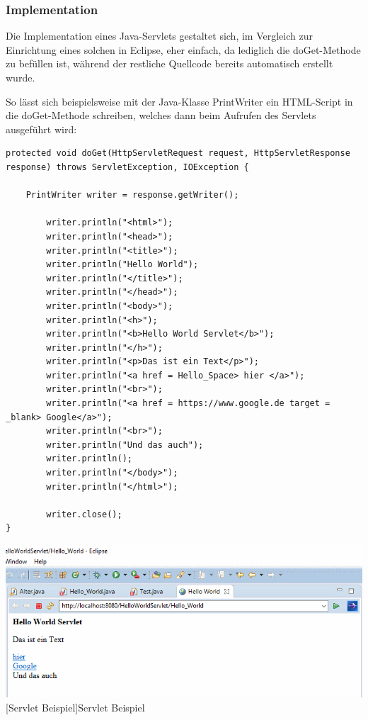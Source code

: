 \documentclass[12pt,a4paper,bibliography=totocnumbered,listof=totocnumbered]{scrartcl}
\begin{document}
\subsubsection{Implementation}
Die Implementation eines Java-Servlets gestaltet sich, im Vergleich zur Einrichtung eines solchen in Eclipse, eher einfach, da lediglich die doGet-Methode zu befüllen ist, während der restliche Quellcode bereits automatisch erstellt wurde.

So lässt sich beispielsweise mit der Java-Klasse PrintWriter ein HTML-Script in die doGet-Methode schreiben, welches dann beim Aufrufen des Servlets ausgeführt wird:


\vspace{1em}
\begin{lstlisting}[caption=Servlet Beispielcode, label=lst:servlet-html]
protected void doGet(HttpServletRequest request, HttpServletResponse response) throws ServletException, IOException {

	PrintWriter writer = response.getWriter();
	
		writer.println("<html>");
		writer.println("<head>");
		writer.println("<title>");
		writer.println("Hello World");
		writer.println("</title>");
		writer.println("</head>");
		writer.println("<body>");
		writer.println("<h>");
		writer.println("<b>Hello World Servlet</b>");
		writer.println("</h>");
		writer.println("<p>Das ist ein Text</p>");
		writer.println("<a href = Hello_Space> hier </a>");
		writer.println("<br>");
		writer.println("<a href = https://www.google.de target = _blank> Google</a>");
		writer.println("<br>");
		writer.println("Und das auch");
		writer.println();
		writer.println("</body>");
		writer.println("</html>");
		
		writer.close();		
}			
\end{lstlisting}


\vspace{1em}
\begin{minipage}{\linewidth}
	\centering
	\includegraphics[width=0.9\linewidth]{Bilder/Servlet-Beispiel.png}
	[Servlet Beispiel]{Servlet Beispiel}	
	\label{fig:eclipse6}
\end{minipage}
\\
\end{document}
